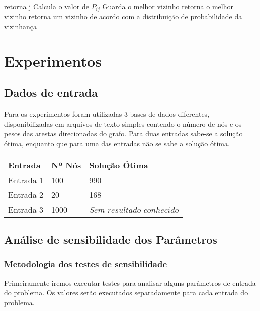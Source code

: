 \documentclass{article}
\begin{document}
\begin{algorithmic}
 \STATE retorna j
 \ENDIF
 \STATE Calcula o valor de $P_{ij}$ 
 \STATE Guarda o melhor vizinho
 \ENDFOR
 \STATE retorna o melhor vizinho
 \ELSE 
 \STATE retorna um vizinho de acordo com a distribuição de probabilidade da vizinhança
 \ENDIF
 \end{algorithmic}

\section{Experimentos}

\subsection{Dados de entrada}

Para os experimentos foram utilizadas 3 bases de dados diferentes, disponibilizadas em arquivos de texto simples contendo o número de nós e os pesos das arestas direcionadas do grafo. Para duas entradas sabe-se a solução ótima, enquanto que para uma das entradas não se sabe a solução ótima.
\newline
\begin{center}
    \begin{tabular}{| l | l | l |}
    \hline
    Entrada & Nº Nós & Solução Ótima \\ \hline
    Entrada 1 & 100 & 990\\ \hline
    Entrada 2 & 20 & 168\\ \hline
    Entrada 3 & 1000 & $Sem$ $resultado$ $conhecido$ \\ \hline
    \end{tabular}
\end{center}

\subsection{Análise de sensibilidade dos Parâmetros}
\par

\subsubsection{Metodologia dos testes de sensibilidade}
\par

Primeiramente iremos executar testes para analisar alguns parâmetros de entrada do problema. Os valores serão executados separadamente para cada entrada do problema. 
\end{document}
